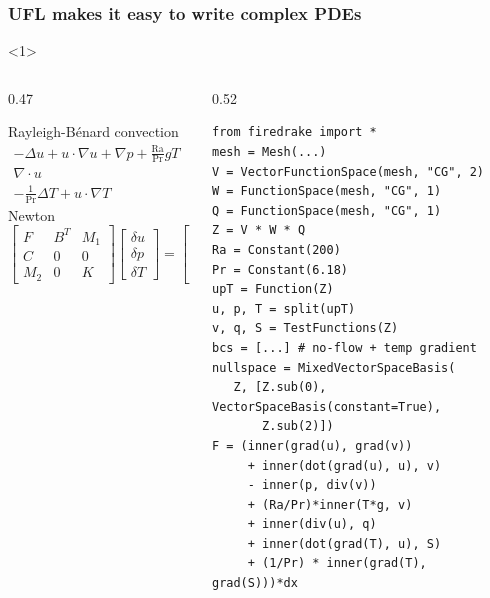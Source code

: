 \documentclass[presentation,aspectratio=43]{beamer}
\begin{document}
\begin{frame}[fragile,t]
  \frametitle{UFL makes it easy to write complex PDEs}
  \begin{onlyenv}<1>
    \begin{columns}[t]
      \begin{column}{0.47\framewidth}
        \small
        \begin{block}{Rayleigh-B\'enard convection}
          \begin{equation*}
            \begin{split}
              -\Delta u + u\cdot\nabla u + \nabla p +
              \frac{\text{Ra}}{\text{Pr}} \hat{g}T &= 0 \\
              \nabla \cdot u &= 0 \\
              - \frac{1}{\text{Pr}} \Delta T + u\cdot \nabla T &= 0
            \end{split}
          \end{equation*}
          Newton
          \begin{equation*}
            \begin{bmatrix}
              F   & B^T & M_1 \\
              C   & 0   & 0   \\
              M_2 & 0 & K
            \end{bmatrix}
            \begin{bmatrix}
              \delta u \\
              \delta p \\
              \delta T
            \end{bmatrix} =
            \begin{bmatrix}
              f_1 \\
              f_2 \\
              f_3
            \end{bmatrix}
          \end{equation*}
        \end{block}
      \end{column}
      \begin{column}{0.52\framewidth}
\begin{verbatim}
from firedrake import *
mesh = Mesh(...)
V = VectorFunctionSpace(mesh, "CG", 2)
W = FunctionSpace(mesh, "CG", 1)
Q = FunctionSpace(mesh, "CG", 1)
Z = V * W * Q
Ra = Constant(200)
Pr = Constant(6.18)
upT = Function(Z)
u, p, T = split(upT)
v, q, S = TestFunctions(Z)
bcs = [...] # no-flow + temp gradient
nullspace = MixedVectorSpaceBasis(
   Z, [Z.sub(0), VectorSpaceBasis(constant=True),
       Z.sub(2)])
F = (inner(grad(u), grad(v))
     + inner(dot(grad(u), u), v)
     - inner(p, div(v))
     + (Ra/Pr)*inner(T*g, v)
     + inner(div(u), q)
     + inner(dot(grad(T), u), S)
     + (1/Pr) * inner(grad(T), grad(S)))*dx


\end{verbatim}
\end{column}
\end{columns}
\end{onlyenv}
\end{frame}
\end{document}
